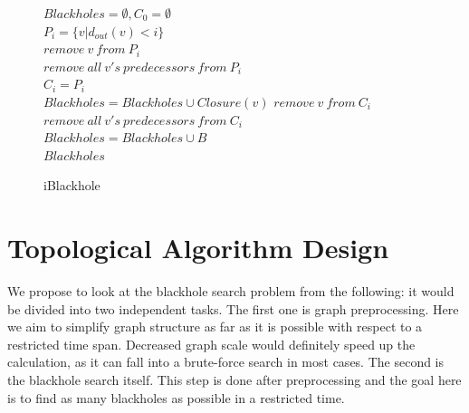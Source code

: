 \documentclass{svproc}
\begin{document}
\begin{figure}[H]
\begin{center}
\begin{algorithm}[H]
                        $Blackholes = \emptyset, C_0 = \emptyset$ \\
                         {
                            $P_i = \{v | d_{out}(v) < i\}$  
                             \\
                             {
                                 {
                                     {
                                        $remove\ v\ from\ P_i$\\
                                        $remove\ all\ v's\ predecessors\ from\ P_i$\\
                                    }
                                }
                            }
                        }
                        $C_i = P_i$   \\
                         {
                             {
                                $Blackholes = Blackholes \cup Closure(v)$
                            }
                             {
                                $remove\ v\ from\ C_i$ \\
                                $remove\ all\ v's\ predecessors\ from\ C_i$ \\
                            }
                        }
                         {
                             {
                                 {
                                    $Blackholes = Blackholes \cup B$ \\
                                }
                            }
                        }
                        \Return $Blackholes$
			\label{alg:iblackhole}
			\caption{iBlackhole}
		\end{algorithm}
	\end{center}
\end{figure}

\section{Topological Algorithm Design}
We propose to look at the blackhole search problem from the following: it would be divided into two independent tasks. 
The first one is graph preprocessing. Here we aim to simplify graph structure as far as it is possible with respect to a restricted time span. 
Decreased graph scale would definitely speed up the calculation, as it can fall into a brute-force search in most cases.
The second is the blackhole search itself. This step is done after preprocessing and the goal here is to find as many blackholes as possible in a restricted time.
\end{document}
